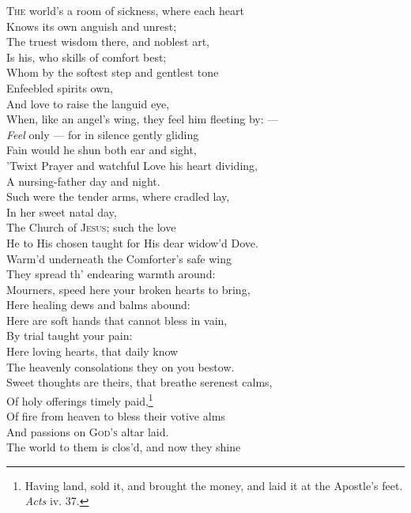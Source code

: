 \textsc{The} world’s a room of sickness, where each heart \\
 Knows its own anguish and unrest; \\
 The truest wisdom there, and noblest art, \\
 Is his, who skills of comfort best; \\
 Whom by the softest step and gentlest tone \\
 Enfeebled spirits own, \\
 And love to raise the languid eye, \\
 When, like an angel’s wing, they feel him fleeting by: — \\
  \emph{Feel} only — for in silence gently gliding \\
 Fain would he shun both ear and sight, \\
 ’Twixt Prayer and watchful Love his heart dividing, \\
 A nursing-father day and night. \\
 Such were the tender arms, where cradled lay, \\
 In her sweet natal day, \\
 The Church of \textsc{Jesus}; such the love \\
 He to His chosen taught for His dear widow’d Dove. \\
  Warm’d underneath the Comforter’s safe wing \\
 They spread th’ endearing warmth around: \\
 Mourners, speed here your broken hearts to bring, \\
 Here healing dews and balms abound: \\
 Here are soft hands that cannot bless in vain, \\
 By trial taught your pain: \\
 Here loving hearts, that daily know \\
 The heavenly consolations they on you bestow. \\
  Sweet thoughts are theirs, that breathe serenest calms, \\
 Of holy offerings timely paid,\footnote{Having land, sold it, and brought the money, and laid it at the Apostle’s feet. \emph{Acts} iv. 37.} \\
 Of fire from heaven to bless their votive alms \\
 And passions on \textsc{God’s} altar laid. \\
 The world to them is clos’d, and now they shine \\
